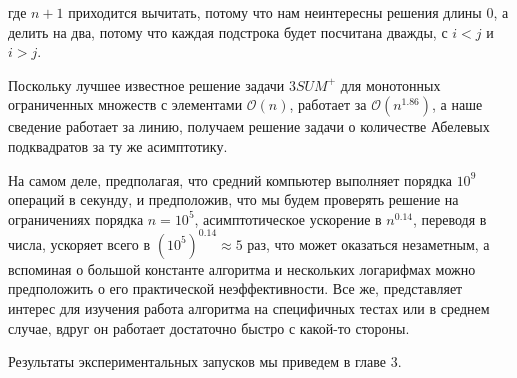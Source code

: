 где $n+1$ приходится вычитать, потому что нам неинтересны решения длины 0, а делить на два, потому что каждая подстрока будет посчитана дважды, с $i<j$ и $i>j$.

Поскольку лучшее известное решение задачи $3SUM^+$ для монотонных ограниченных множеств с элементами $\mathcal{O}(n)$, работает за $\mathcal{O}(n^{1.86})$, а наше сведение работает за линию, получаем решение задачи о количестве Абелевых подквадратов за ту же асимптотику.

На самом деле, предполагая, что средний компьютер выполняет порядка $10^9$ операций в секунду, и предположив, что мы будем проверять решение на ограничениях порядка $n=10^5$, асимптотическое ускорение в $n^{0.14}$, переводя в числа, ускоряет всего в ${(10^5)}^{0.14} \approx 5$ раз, что может оказаться незаметным, а вспоминая о большой константе алгоритма и нескольких логарифмах можно предположить о его практической неэффективности. Все же, представляет интерес для изучения работа алгоритма на специфичных тестах или в среднем случае, вдруг он работает достаточно быстро с какой-то стороны. 

Результаты экспериментальных запусков мы приведем в главе 3.

